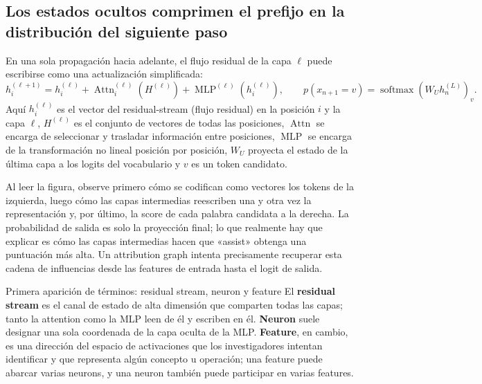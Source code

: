\subsection{Los estados ocultos comprimen el prefijo en la distribución del siguiente paso}

En una sola propagación hacia adelante, el flujo residual de la capa $\ell$ puede escribirse como una actualización simplificada:
\[
h_i^{(\ell+1)}=h_i^{(\ell)}
+\operatorname{Attn}^{(\ell)}_i(H^{(\ell)})
+\operatorname{MLP}^{(\ell)}(h_i^{(\ell)}),
\qquad
p(x_{n+1}=v)=\operatorname{softmax}(W_U h_n^{(L)})_v.
\]
Aquí $h_i^{(\ell)}$ es el vector del residual-stream (flujo residual) en la posición $i$ y la capa $\ell$, $H^{(\ell)}$ es el conjunto de vectores de todas las posiciones, $\operatorname{Attn}$ se encarga de seleccionar y trasladar información entre posiciones, $\operatorname{MLP}$ se encarga de la transformación no lineal posición por posición, $W_U$ proyecta el estado de la última capa a los logits del vocabulario y $v$ es un token candidato.


Al leer la figura, observe primero cómo se codifican como vectores los tokens de la izquierda, luego cómo las capas intermedias reescriben una y otra vez la representación y, por último, la score de cada palabra candidata a la derecha. La probabilidad de salida es solo la proyección final; lo que realmente hay que explicar es cómo las capas intermedias hacen que «assist» obtenga una puntuación más alta. Un attribution graph intenta precisamente recuperar esta cadena de influencias desde las features de entrada hasta el logit de salida.

\begin{knowledgebox}{Primera aparición de términos: residual stream, neuron y feature}
El \textbf{residual stream} es el canal de estado de alta dimensión que comparten todas las capas; tanto la attention como la MLP leen de él y escriben en él. \textbf{Neuron} suele designar una sola coordenada de la capa oculta de la MLP. \textbf{Feature}, en cambio, es una dirección del espacio de activaciones que los investigadores intentan identificar y que representa algún concepto u operación; una feature puede abarcar varias neurons, y una neuron también puede participar en varias features.
\end{knowledgebox}

